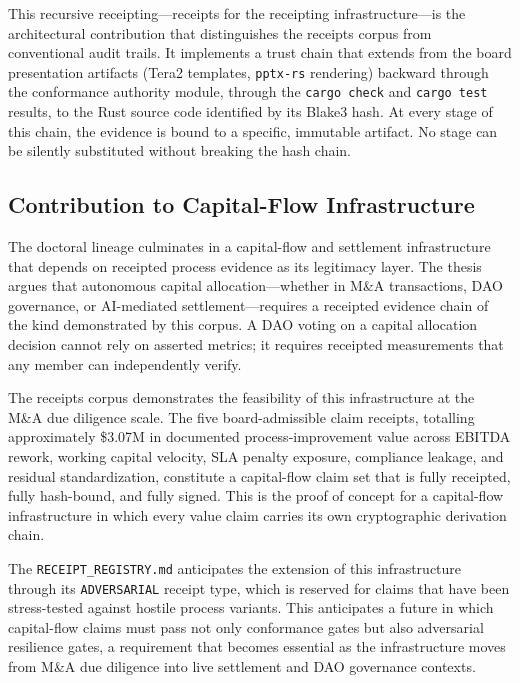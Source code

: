 This recursive receipting---receipts for the receipting infrastructure---is the
architectural contribution that distinguishes the receipts corpus from conventional
audit trails. It implements a trust chain that extends from the board presentation
artifacts (Tera2 templates, \texttt{pptx-rs} rendering) backward through the
conformance authority module, through the \texttt{cargo check} and \texttt{cargo test}
results, to the Rust source code identified by its Blake3 hash. At every stage of
this chain, the evidence is bound to a specific, immutable artifact. No stage can
be silently substituted without breaking the hash chain.

\subsection{Contribution to Capital-Flow Infrastructure}
\label{sec:receipts-contribution-capital}

The doctoral lineage culminates in a capital-flow and settlement infrastructure that
depends on receipted process evidence as its legitimacy layer. The thesis argues that
autonomous capital allocation---whether in M\&A transactions, DAO governance, or
AI-mediated settlement---requires a receipted evidence chain of the kind demonstrated
by this corpus. A DAO voting on a capital allocation decision cannot rely on asserted
metrics; it requires receipted measurements that any member can independently verify.

The receipts corpus demonstrates the feasibility of this infrastructure at the
M\&A due diligence scale. The five board-admissible claim receipts, totalling
approximately \$3.07M in documented process-improvement value across EBITDA rework,
working capital velocity, SLA penalty exposure, compliance leakage, and residual
standardization, constitute a capital-flow claim set that is fully receipted, fully
hash-bound, and fully signed. This is the proof of concept for a capital-flow
infrastructure in which every value claim carries its own cryptographic derivation
chain.

The \texttt{RECEIPT\_REGISTRY.md} anticipates the extension of this infrastructure
through its \texttt{ADVERSARIAL} receipt type, which is reserved for claims that
have been stress-tested against hostile process variants. This anticipates a future
in which capital-flow claims must pass not only conformance gates but also adversarial
resilience gates, a requirement that becomes essential as the infrastructure moves
from M\&A due diligence into live settlement and DAO governance contexts.
